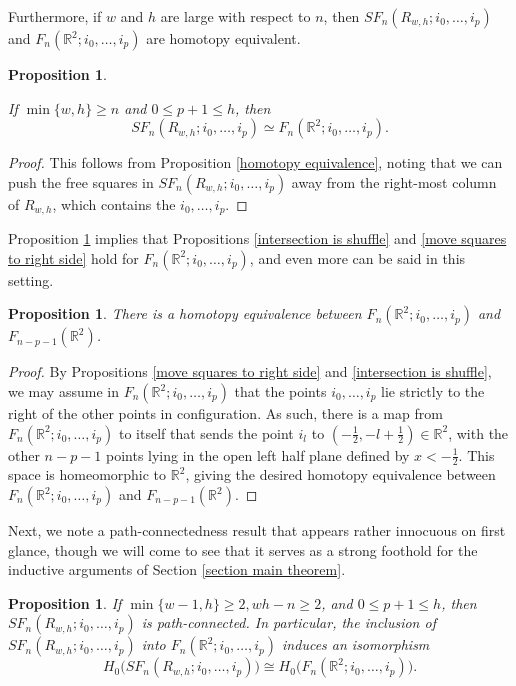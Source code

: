 \documentclass[pagebackref,colorlinks,citecolor=blue,linkcolor=blue,urlcolor=blue,filecolor=blue]{article}
\newtheorem{prop}[thm]{Proposition}
\theoremstyle{definition}\newtheorem{definition}[thm]{Definition}
\theoremstyle{definition}
\newcommand{\R}{\ensuremath{\mathbb{R}}}
\begin{document}
Furthermore, if $w$ and $h$ are large with respect to $n$, then $SF_{n}(R_{w,h}; i_{0}, \dots, i_{p})$ and $F_{n}(\R^{2}; i_{0}, \dots, i_{p})$ are homotopy equivalent.

\begin{prop}\label{homotopy equivalence for i0...ip}

If $\min\{w,h\}\ge n$ and $0\le p+1\le h$, then
\[
SF_{n}(R_{w,h}; i_{0}, \dots, i_{p})\simeq F_{n}(\R^{2}; i_{0}, \dots, i_{p}).
\]
\end{prop}

\begin{proof}
This follows from Proposition \ref{homotopy equivalence}, noting that we can push the free squares in $SF_{n}(R_{w,h}; i_{0}, \dots, i_{p})$ away from the right-most column of $R_{w,h}$, which contains the $i_{0},\dots, i_{p}$.
\end{proof}

Proposition \ref{homotopy equivalence for i0...ip} implies that  Propositions \ref{intersection is shuffle} and \ref{move squares to right side} hold for $F_{n}(\R^{2}; i_{0}, \dots, i_{p})$, and even more can be said in this setting.

\begin{prop}\label{forget points on the right}
There is a homotopy equivalence between $F_{n}(\R^{2}; i_{0}, \dots, i_{p})$ and $F_{n-p-1}(\R^{2})$.
\end{prop}

\begin{proof}
By Propositions \ref{move squares to right side} and \ref{intersection is shuffle}, we may assume in $F_{n}(\R^{2}; i_{0}, \dots, i_{p})$ that the points $i_{0}, \dots, i_{p}$ lie strictly to the right of the other points in configuration.
As such, there is a map from $F_{n}(\R^{2};i_{0}, \dots, i_{p})$ to itself that sends the point $i_{l}$ to $(-\frac{1}{2}, -l+\frac{1}{2})\in \R^{2}$, with the other $n-p-1$ points lying in the open left half plane defined by $x<-\frac{1}{2}$.
This space is homeomorphic to $\R^{2}$, giving the desired homotopy equivalence between $F_{n}(\R^{2}; i_{0}, \dots, i_{p})$ and $F_{n-p-1}(\R^{2})$.
\end{proof}

Next, we note a path-connectedness result that appears rather innocuous on first glance, though we will come to see that it serves as a strong foothold for the inductive arguments of Section \ref{section main theorem}.

\begin{prop}\label{connected single right configuration space}
If $\min\{w-1, h\}\ge 2, wh-n\ge 2$, and $0\le p+1\le h$, then $SF_{n}(R_{w,h}; i_{0}, \dots, i_{p})$ is path-connected.
In particular, the inclusion of $SF_{n}(R_{w,h}; i_{0}, \dots, i_{p})$ into $F_{n}(\R^{2}; i_{0}, \dots, i_{p})$ induces an isomorphism
\[
H_{0}\big(SF_{n}(R_{w,h}; i_{0}, \dots, i_{p})\big)\cong H_{0}\big(F_{n}(\R^{2}; i_{0}, \dots, i_{p})\big).
\]
\end{prop}
\end{document}
